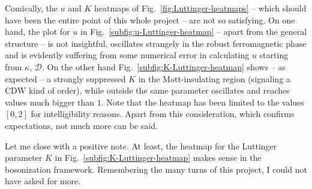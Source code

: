 Comically, the $u$ and $K$ heatmaps of Fig.~\ref{fig:Luttinger-heatmaps} -- which should have been the entire point of this whole project -- are not so satisfying. On one hand, the plot for $u$ in Fig.~\ref{subfig:u-Luttinger-heatmap} -- apart from the general structure -- is not insightful, oscillates strangely in the robust ferromagnetic phase and is evidently suffering from some numerical error in calculating $u$ starting from $\kappa$, $\mathcal{D}$. On the other hand Fig.~\ref{subfig:K-Luttinger-heatmap} shows -- as expected -- a strongly suppressed $K$ in the Mott-insulating region (signaling a $\mathrm{CDW}$ kind of order), while outside the same parameter oscillates and reaches values much bigger than $1$. Note that the heatmap has been limited to the values $[0,2]$ for intelligibility reasons. Apart from this consideration, which confirms expectations, not much more can be said.

Let me close with a positive note. At least, the heatmap for the Luttinger parameter $K$ in Fig.~\ref{subfig:K-Luttinger-heatmap} makes sense in the bosonization framework. Remembering the many turns of this project, I could not have asked for more.
